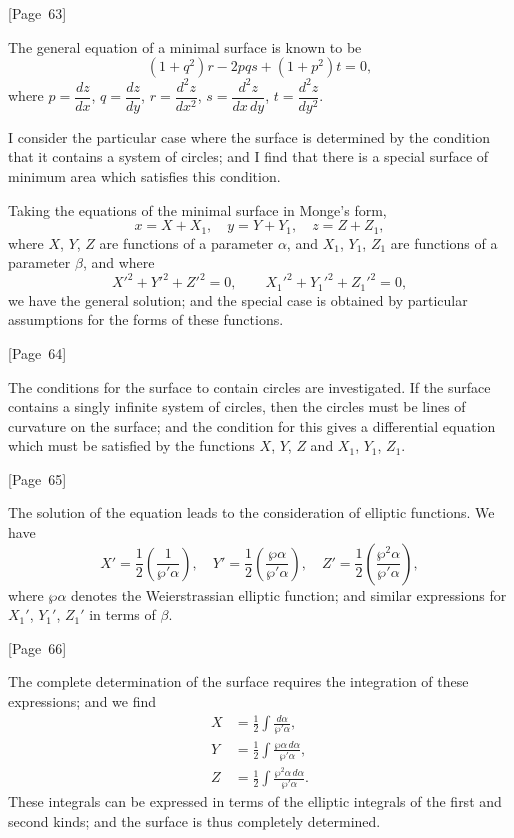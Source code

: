 \documentclass[11pt,a4paper]{article}
\theoremstyle{plain}
\theoremstyle{definition}
\theoremstyle{remark}
\begin{document}
\begin{center}
[Page~63]
\end{center}

The general equation of a minimal surface is known to be
\[
(1 + q^2)r - 2pqs + (1 + p^2)t = 0,
\]
where $p = \dfrac{dz}{dx}$, $q = \dfrac{dz}{dy}$, $r = \dfrac{d^2z}{dx^2}$,
$s = \dfrac{d^2z}{dx\,dy}$, $t = \dfrac{d^2z}{dy^2}$.

I consider the particular case where the surface is determined by the
condition that it contains a system of circles; and I find that there
is a special surface of minimum area which satisfies this condition.

Taking the equations of the minimal surface in Monge's form,
\[
x = X + X_1, \quad y = Y + Y_1, \quad z = Z + Z_1,
\]
where $X$, $Y$, $Z$ are functions of a parameter $\alpha$, and $X_1$,
$Y_1$, $Z_1$ are functions of a parameter $\beta$, and where
\[
X'^2 + Y'^2 + Z'^2 = 0, \qquad X_1'^2 + Y_1'^2 + Z_1'^2 = 0,
\]
we have the general solution; and the special case is obtained by
particular assumptions for the forms of these functions.

\begin{center}
[Page~64]
\end{center}

The conditions for the surface to contain circles are investigated.
If the surface contains a singly infinite system of circles, then the
circles must be lines of curvature on the surface; and the condition
for this gives a differential equation which must be satisfied by the
functions $X$, $Y$, $Z$ and $X_1$, $Y_1$, $Z_1$.

\begin{center}
[Page~65]
\end{center}

The solution of the equation leads to the consideration of elliptic
functions. We have
\[
X' = \frac{1}{2}\left(\frac{1}{\wp'\alpha}\right), \quad
Y' = \frac{1}{2}\left(\frac{\wp\alpha}{\wp'\alpha}\right), \quad
Z' = \frac{1}{2}\left(\frac{\wp^2\alpha}{\wp'\alpha}\right),
\]
where $\wp\alpha$ denotes the Weierstrassian elliptic function; and
similar expressions for $X_1'$, $Y_1'$, $Z_1'$ in terms of $\beta$.

\begin{center}
[Page~66]
\end{center}

The complete determination of the surface requires the integration of
these expressions; and we find
\begin{align*}
X &= \frac{1}{2}\int \frac{d\alpha}{\wp'\alpha}, \\
Y &= \frac{1}{2}\int \frac{\wp\alpha\,d\alpha}{\wp'\alpha}, \\
Z &= \frac{1}{2}\int \frac{\wp^2\alpha\,d\alpha}{\wp'\alpha}.
\end{align*}
These integrals can be expressed in terms of the elliptic integrals of
the first and second kinds; and the surface is thus completely
determined.
\end{document}
